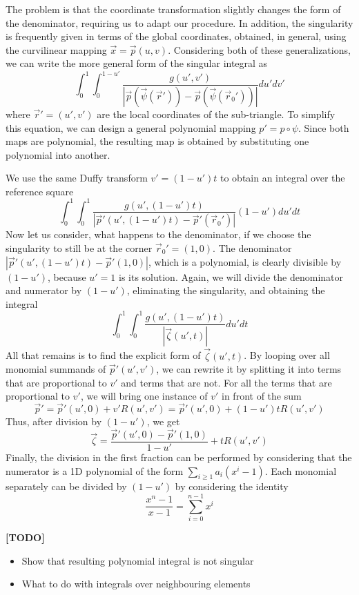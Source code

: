 \noindent
The problem is that the coordinate transformation slightly changes the form of the denominator, requiring us to adapt our procedure. In addition, the singularity is frequently given
in terms of the global coordinates, obtained, in general, using the curvilinear mapping $\vec{x} = \vec{p}(u, v)$. Considering both of these generalizations, we can write the more general
form of the singular integral as 
\[ \int_0^1 \int_0^{1-u'} \frac{g(u',v')}{|\vec{p}(\vec{\psi}(\vec{r}')) - \vec{p}(\vec{\psi}(\vec{r}_0'))|} du' dv' \]
where $\vec{r}' = (u', v')$ are the local coordinates of the sub-triangle. To simplify this equation, we can design a general polynomial mapping $p' = p \circ \psi$.
Since both maps are polynomial, the resulting map is obtained by substituting one polynomial into another.

\noindent
We use the same Duffy transform $v' = (1-u')t$ to obtain an integral over the reference square
\[ \int_0^1 \int_0^1 \frac{g(u',(1-u')t)}{|\vec{p}'(u',(1-u')t) - \vec{p}'(\vec{r}_0')|} (1-u')du' dt \]
Now let us consider, what happens to the denominator, if we choose the singularity to still be at the corner $\vec{r}_0' = (1,0)$.
The denominator $|\vec{p}'(u',(1-u')t) - \vec{p}'(1,0)|$, which is a polynomial, is clearly divisible by $(1-u')$, because $u' = 1$ is its solution. Again, we will divide the denominator
and numerator by $(1-u')$, eliminating the singularity, and obtaining the integral
\[ \int_0^1 \int_0^1 \frac{g(u',(1-u')t)}{|\vec{\zeta}(u', t)|} du' dt \]
All that remains is to find the explicit form of $\vec{\zeta}(u', t)$. By looping over all monomial summands of $\vec{p}'(u',v')$, we can rewrite it by splitting it into terms that
are proportional to $v'$ and terms that are not. For all the terms that are proportional to $v'$, we will bring one instance of $v'$ in front of the sum
\[ \vec{p}' = \vec{p}'(u', 0) + v' R(u', v') = \vec{p}'(u', 0) + (1-u')t R(u', v') \]
Thus, after division by $(1-u')$, we get
\[ \vec{\zeta} = \frac{\vec{p}'(u', 0) - \vec{p}'(1, 0)}{1-u'} + t R(u', v') \]
Finally, the division in the first fraction can be performed by considering that the numerator is a 1D polynomial of the form $\sum_{i \geq 1} a_i (x^i - 1)$.
Each monomial separately can be divided by $(1-u')$ by considering the identity
\[ \frac{x^n - 1}{x - 1} = \sum_{i=0}^{n-1} x^i \]


\textbf{[TODO]}
\begin{itemize}
  \item Show that resulting polynomial integral is not singular
  \item What to do with integrals over neighbouring elements
\end{itemize}